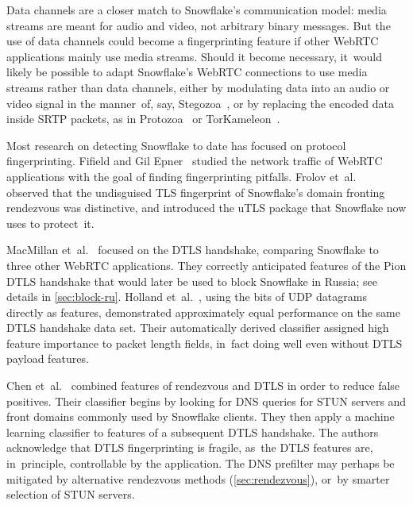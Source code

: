 \documentclass[letterpaper,twocolumn]{article}
\begin{document}
\begin{description}
Data channels are a closer match to Snowflake's communication model:
media streams are meant for audio and video,
not arbitrary binary messages.
But the use of data channels could become
a fingerprinting feature if other WebRTC applications mainly use media streams.
Should it become necessary,
it~would likely be possible to adapt Snowflake's WebRTC connections
to use media streams rather than data channels,
either by modulating data into an
audio or video signal in the manner~of, say,
Stegozoa~\cite[\S 3.3]{Figueira2022a},
or by replacing the encoded data inside SRTP packets,
as in Protozoa~\cite[\S 4.4]{Barradas2020a}
or TorKameleon~\cite[\S \mbox{III-D}]{Vilalonga2023a}.

\end{description}

Most research on detecting Snowflake to date
has focused on protocol fingerprinting.
Fifield and Gil Epner~\cite{arxiv.1605.08805}
studied the network traffic of WebRTC applications
with the goal of finding fingerprinting pitfalls.
Frolov et~al.~\cite[\S \mbox{V-C}]{Frolov2019a}
observed that the undisguised TLS fingerprint
of Snowflake's domain fronting rendezvous was distinctive,
and introduced the uTLS package that Snowflake
now uses to protect~it.

MacMillan et~al.~\cite{arxiv.2008.03254}
focused on the DTLS handshake,
comparing Snowflake to three other WebRTC applications.
They correctly anticipated features
of the Pion DTLS handshake
that would later be used
to block Snowflake in Russia;
see details in \autoref{sec:block-ru}.
Holland et~al.~\cite[\S 5.3]{Holland2021a},
using the bits of UDP datagrams directly as features,
demonstrated approximately equal performance
on the same DTLS handshake data set.
Their automatically derived classifier assigned high feature importance
to packet length fields,
in~fact doing well even without DTLS payload features.

Chen et~al.~\cite{Chen2023a}
combined features
of rendezvous and DTLS
in order to reduce false positives.
Their classifier begins
by looking for DNS queries for
STUN servers and front domains commonly used by Snowflake clients.
They then apply a machine learning classifier
to features of a subsequent DTLS handshake.
The authors acknowledge that DTLS fingerprinting
is fragile, as~the DTLS features are, in~principle,
controllable by the application.
The DNS prefilter may perhaps be mitigated
by alternative rendezvous methods (\autoref{sec:rendezvous}),
or~by smarter selection of STUN servers.
\end{document}
